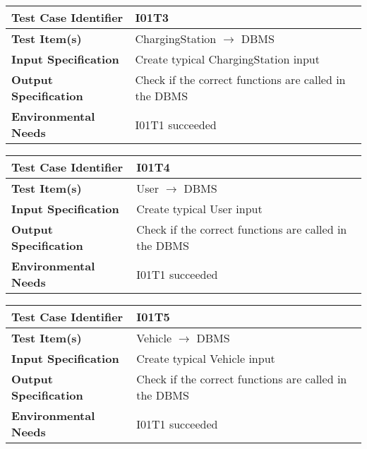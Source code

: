 \begin{center}
	\vspace{0.6cm}
	\begin{tabular}{|l|l|}
		\hline
		\textbf{Test Case Identifier} & I01T3 \bigstrut \\\hline
		\textbf{Test Item(s)} & ChargingStation \ensuremath{\rightarrow} DBMS \bigstrut \\\hline
		\textbf{Input Specification} & Create typical ChargingStation input \bigstrut \\\hline
		\textbf{Output Specification} & Check if the correct functions are called in the DBMS \bigstrut \\\hline
		\textbf{Environmental Needs} & I01T1 succeeded\bigstrut \\\hline
	\end{tabular}
\end{center}

\begin{center}
	\vspace{0.6cm}
	\begin{tabular}{|l|l|}
		\hline
		\textbf{Test Case Identifier} & I01T4 \bigstrut \\\hline
		\textbf{Test Item(s)} & User \ensuremath{\rightarrow} DBMS \bigstrut \\\hline
		\textbf{Input Specification} & Create typical User input \bigstrut \\\hline
		\textbf{Output Specification} & Check if the correct functions are called in the DBMS \bigstrut \\\hline
		\textbf{Environmental Needs} & I01T1 succeeded\bigstrut \\\hline
	\end{tabular}
\end{center}

\begin{center}
	\vspace{0.6cm}
	\begin{tabular}{|l|l|}
		\hline
		\textbf{Test Case Identifier} & I01T5 \bigstrut \\\hline
		\textbf{Test Item(s)} & Vehicle \ensuremath{\rightarrow} DBMS \bigstrut \\\hline
		\textbf{Input Specification} & Create typical Vehicle input \bigstrut \\\hline
		\textbf{Output Specification} & Check if the correct functions are called in the DBMS \bigstrut \\\hline
		\textbf{Environmental Needs} & I01T1 succeeded\bigstrut \\\hline
	\end{tabular}
\end{center}

